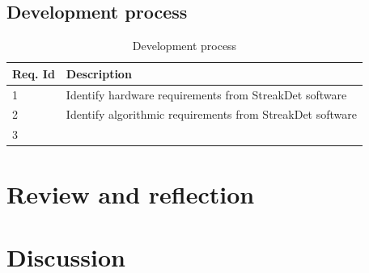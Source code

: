 \documentclass[12pt]{report}
\begin{document}
\section{Development process}
\begin{table}[h]
    \begin{tabular}{|p{3cm}|p{10cm}|}
        \hline
        \textbf{Req. Id}& \textbf{Description}\\
        \hline
        1&Identify hardware requirements from StreakDet software\\
        \hline
        2&Identify algorithmic requirements from StreakDet software\\ 
        \hline
        3&\\
        \hline
    \end{tabular}
    \caption{Development process}
    \label{table:dev_process}
\end{table}

\chapter{Review and reflection}

\chapter{Discussion}




\end{document}
